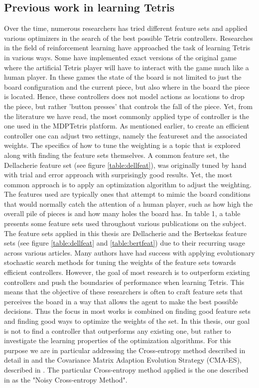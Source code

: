 \subsection{Previous work in learning Tetris\label{prevWork}}
Over the time, numerous researchers has tried different feature 
sets and applied various optimizers in the search of the best 
possible Tetris controllers. Researches in the field
of reinforcement learning have approached the task of learning Tetris
in various ways. Some have implemented exact versions of the original game
where the artificial Tetris player will have to interact with the 
game much like a human player. In these games the state of the board is not limited
to just the board configuration and the current piece, but also where in the 
board the piece is located. Hence, these controllers does not model actions 
as locations to drop the piece, but rather 'button presses' that controls the
fall of the piece. Yet, from the literature we have read, the most commonly applied 
type of controller is the one used in the MDPTetris platform. As mentioned earlier,
to create an efficient controller one can adjust two settings, namely the featureset 
and the associated weights. 
The specifics of how to tune the weighting is a topic that is 
explored along with finding the feature sets themselves. A common 
feature set, the Dellacherie feature set (see figure \ref{table:dellfeat}),
was originally tuned by hand with trial and error approach with surprisingly 
good results. Yet, the most common approach is to apply an optimization 
algorithm to adjust the weighting.
The features used are typically
ones that attempt to mimic the board conditions that would
normally catch the attention of a human player, such as
how high the overall pile of pieces is and how many holes 
the board has. In \citep{scherrer2009:b} table 1, a table 
presents some feature sets used throughout various publications
on the subject. The feature sets applied in this thesis are 
Dellacherie and the Bertsekas feature sets 
(see figure \ref{table:dellfeat} and \ref{table:bertfeat}) due 
to their recurring usage across various articles.
Many authors have had success
with applying evolutionary stochastic search methods for tuning 
the weights of the feature sets towards
efficient controllers. However, the goal of most research 
is to outperform existing controllers and push the boundaries
of performance when learning Tetris. This means that the objective of
these researchers is often to craft feature sets that perceives the 
board in a way that allows the agent to make the best possible decisions.
Thus the focus in most works is combined on finding good feature sets and 
finding good ways to optimize the weights of the set. In this thesis,
our goal is not to find a controller that outperforms any existing one,
but rather to investigate the learning properties of the optimization algorithms.
For this purpose
we are in particular addressing the
Cross-entropy method described in detail in \citep{cetut2014} and the
Covariance Matrix Adaption Evolution Strategy (CMA-ES), described 
in \citep{hansen2011}. The particular Cross-entropy method applied 
is the one described in \citep{szita:06} as the "Noisy Cross-entropy Method".\\

